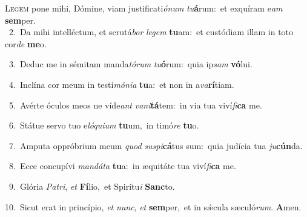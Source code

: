 \lettrine{\initial\textcolor{\initialcolor}{L}}{egem} pone mihi, Dómine, viam justificati\-\textit{ó}\-\textit{num} \textit{tu}\-\textbf{á}rum:~\star et exquíram e\textit{am} \textbf{sem}\-per.\\
{\numbfont\textcolor{\numbcolor}{~2.}}~Da mihi intelléctum, et scrutá\textit{bor} \textit{le}\-\textit{gem} \textbf{tu}\-am:~\star et custódiam illam in toto cor\textit{de} \textbf{me}\-o.\par
{\numbfont\textcolor{\numbcolor}{~3.}}~Deduc me in sémitam manda\-\textit{tó}\-\textit{rum} \textit{tu}\-\textbf{ó}rum:~\star quia ip\textit{sam} \textbf{vó}\-lui.\par
{\numbfont\textcolor{\numbcolor}{~4.}}~Inclína cor meum in testi\-\textit{mó}\-\textit{ni}\textit{a} \textbf{tu}\-a:~\star et non in a\-\textit{va}\-\textbf{rí}tiam.\par
{\numbfont\textcolor{\numbcolor}{~5.}}~Avérte óculos meos ne víde\textit{ant} \textit{va}\-\textit{ni}\textbf{tá}tem:~\star in via tua viví\-\textit{fi}\-\textbf{ca} me.\par
{\numbfont\textcolor{\numbcolor}{~6.}}~Státue servo tuo e\-\textit{ló}\-\textit{qui}\textit{um} \textbf{tu}\-um,~\star in timó\textit{re} \textbf{tu}\-o.\par
{\numbfont\textcolor{\numbcolor}{~7.}}~Amputa oppróbrium meum \textit{quod} \textit{su}\-\textit{spi}\textbf{cá}tus sum:~\star quia judícia tua \textit{ju}\-\textbf{cún}da.\par
{\numbfont\textcolor{\numbcolor}{~8.}}~Ecce concupívi \textit{man}\-\textit{dá}\textit{ta} \textbf{tu}\-a:~\star in æquitáte tua viví\-\textit{fi}\-\textbf{ca} me.\par
{\numbfont\textcolor{\numbcolor}{~9.}}~Glória \textit{Pa}\-\textit{tri}, \textit{et} \textbf{Fí}\-lio,~\star et Spirítu\textit{i} \textbf{Sanc}\-to.\par
{\numbfont\textcolor{\numbcolor}{10.}}~Sicut erat in princípio, \textit{et} \textit{nunc}\-, \textit{et} \textbf{sem}\-per,~\star et in sǽcula sæculó\-\textit{rum}\-. \textbf{A}\-men.\par
